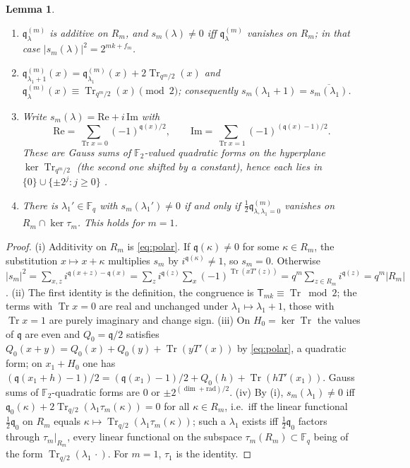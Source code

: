 \documentclass[12pt,a4paper]{amsart}
\newtheorem{lemma}[theorem]{Lemma}
\theoremstyle{definition}
\newcommand{\F}{\mathbb{F}}
\newcommand{\Tr}{\operatorname{Tr}}
\newcommand{\qq}{\mathfrak{q}}
\newcommand{\Tw}{\mathsf{T}}
\begin{document}
\begin{lemma}\label{lem:gaussbasics}
\begin{enumerate}[label=\textup{(\roman*)},leftmargin=2em]
\item $\qq^{(m)}_\lambda$ is additive on $R_m$, and $s_m(\lambda)\ne0$ iff $\qq^{(m)}_\lambda$ vanishes on $R_m$; in that case $|s_m(\lambda)|^2=2^{mk+f_m}$.
\item $\qq^{(m)}_{\lambda_1+1}(x)=\qq^{(m)}_{\lambda_1}(x)+2\Tr_{q^m/2}(x)$ and $\qq^{(m)}_\lambda(x)\equiv\Tr_{q^m/2}(x)\pmod2$; consequently $s_m(\lambda_1+1)=\overline{s_m(\lambda_1)}$.
\item Write $s_m(\lambda)=\mathrm{Re}+i\,\mathrm{Im}$ with
\[
\mathrm{Re}=\sum_{\Tr x=0}(-1)^{\qq(x)/2},\qquad \mathrm{Im}=\sum_{\Tr x=1}(-1)^{(\qq(x)-1)/2}.
\]
These are Gauss sums of $\F_2$-valued quadratic forms on the hyperplane $\ker\Tr_{q^m/2}$ (the second one shifted by a constant), hence each lies in $\{0\}\cup\{\pm2^j:j\ge0\}$ \cite{LidlNiederreiter}.
\item There is $\lambda_1'\in\F_q$ with $s_m(\lambda_1')\ne0$ if and only if $\frac12\qq^{(m)}_{\lambda,\lambda_1=0}$ vanishes on $R_m\cap\ker\tau_m$. This holds for $m=1$.
\end{enumerate}
\end{lemma}
\begin{proof}
(i) Additivity on $R_m$ is \eqref{eq:polar}. If $\qq(\kappa)\ne0$ for some $\kappa\in R_m$, the substitution $x\mapsto x+\kappa$ multiplies $s_m$ by $i^{\qq(\kappa)}\ne1$, so $s_m=0$. Otherwise $|s_m|^2=\sum_{x,z}i^{\qq(x+z)-\qq(x)}=\sum_zi^{\qq(z)}\sum_x(-1)^{\Tr(xT'(z))}=q^m\sum_{z\in R_m}i^{\qq(z)}=q^m|R_m|$. (ii) The first identity is the definition, the congruence is $\Tw_{mk}\equiv\Tr\bmod2$; the terms with $\Tr x=0$ are real and unchanged under $\lambda_1\mapsto\lambda_1+1$, those with $\Tr x=1$ are purely imaginary and change sign. (iii) On $H_0=\ker\Tr$ the values of $\qq$ are even and $Q_0=\qq/2$ satisfies $Q_0(x+y)=Q_0(x)+Q_0(y)+\Tr(yT'(x))$ by \eqref{eq:polar}, a quadratic form; on $x_1+H_0$ one has $(\qq(x_1+h)-1)/2=(\qq(x_1)-1)/2+Q_0(h)+\Tr(hT'(x_1))$. Gauss sums of $\F_2$-quadratic forms are $0$ or $\pm2^{(\dim+\mathrm{rad})/2}$. (iv) By (i), $s_m(\lambda_1)\ne0$ iff $\qq_0(\kappa)+2\Tr_{q/2}(\lambda_1\tau_m(\kappa))=0$ for all $\kappa\in R_m$, i.e.\ iff the linear functional $\frac12\qq_0$ on $R_m$ equals $\kappa\mapsto\Tr_{q/2}(\lambda_1\tau_m(\kappa))$; such a $\lambda_1$ exists iff $\frac12\qq_0$ factors through $\tau_m|_{R_m}$, every linear functional on the subspace $\tau_m(R_m)\subset\F_q$ being of the form $\Tr_{q/2}(\lambda_1\,\cdot)$. For $m=1$, $\tau_1$ is the identity.
\end{proof}
\end{document}
